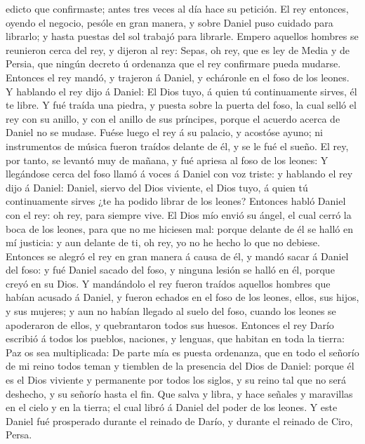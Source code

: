 edicto que confirmaste; antes tres veces al día hace su petición.
 El rey entonces, oyendo el negocio, pesóle en gran manera,
y sobre Daniel puso cuidado para librarlo; y hasta puestas del sol
trabajó para librarle.  Empero aquellos hombres se
reunieron cerca del rey, y dijeron al rey: Sepas, oh rey, que es ley de
Media y de Persia, que ningún decreto ú ordenanza que el rey confirmare
pueda mudarse.  Entonces el rey mandó, y trajeron á Daniel,
y echáronle en el foso de los leones. Y hablando el rey dijo á Daniel:
El Dios tuyo, á quien tú continuamente sirves, él te libre.
 Y fué traída una piedra, y puesta sobre la puerta del
foso, la cual selló el rey con su anillo, y con el anillo de sus
príncipes, porque el acuerdo acerca de Daniel no se mudase.
 Fuése luego el rey á su palacio, y acostóse ayuno; ni
instrumentos de música fueron traídos delante de él, y se le fué el
sueño.  El rey, por tanto, se levantó muy de mañana, y fué
apriesa al foso de los leones:  Y llegándose cerca del foso
llamó á voces á Daniel con voz triste: y hablando el rey dijo á Daniel:
Daniel, siervo del Dios viviente, el Dios tuyo, á quien tú continuamente
sirves ¿te ha podido librar de los leones?  Entonces habló
Daniel con el rey: oh rey, para siempre vive.  El Dios mío
envió su ángel, el cual cerró la boca de los leones, para que no me
hiciesen mal: porque delante de él se halló en mí justicia: y aun
delante de ti, oh rey, yo no he hecho lo que no debiese. 
Entonces se alegró el rey en gran manera á causa de él, y mandó sacar á
Daniel del foso: y fué Daniel sacado del foso, y ninguna lesión se halló
en él, porque creyó en su Dios.  Y mandándolo el rey fueron
traídos aquellos hombres que habían acusado á Daniel, y fueron echados
en el foso de los leones, ellos, sus hijos, y sus mujeres; y aun no
habían llegado al suelo del foso, cuando los leones se apoderaron de
ellos, y quebrantaron todos sus huesos.  Entonces el rey
Darío escribió á todos los pueblos, naciones, y lenguas, que habitan en
toda la tierra: Paz os sea multiplicada:  De parte mía es
puesta ordenanza, que en todo el señorío de mi reino todos teman y
tiemblen de la presencia del Dios de Daniel: porque él es el Dios
viviente y permanente por todos los siglos, y su reino tal que no será
deshecho, y su señorío hasta el fin.  Que salva y libra, y
hace señales y maravillas en el cielo y en la tierra; el cual libró á
Daniel del poder de los leones.  Y este Daniel fué
prosperado durante el reinado de Darío, y durante el reinado de Ciro,
Persa.

